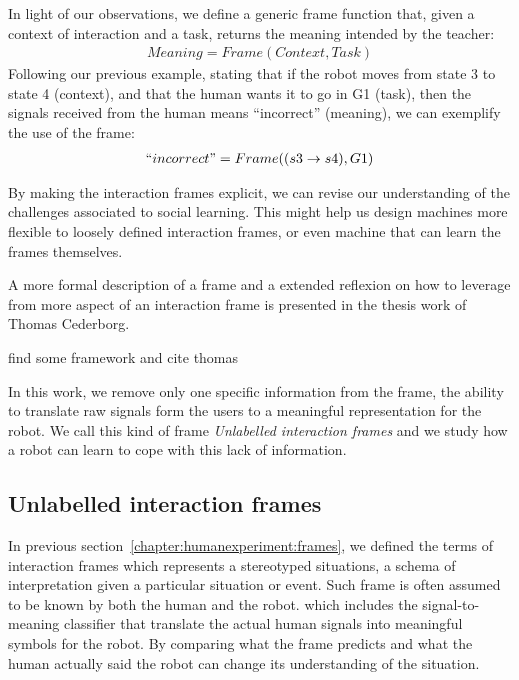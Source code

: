 
In light of our observations, we define a generic frame function that, given a context of interaction and a task, returns the meaning intended by the teacher:
%
\begin{eqnarray}
Meaning = Frame(Context, Task)
\end{eqnarray}
%
Following our previous example, stating that if the robot moves from state 3 to state 4 (context), and that the human wants it to go in G1 (task), then the signals received from the human means ``incorrect'' (meaning), we can exemplify the use of the frame:
%
\begin{eqnarray}
``incorrect" = Frame((s3 \rightarrow s4), G1)
\end{eqnarray}





By making the interaction frames explicit, we can revise our understanding of the challenges associated to social learning. This might help us design machines more flexible to loosely defined interaction frames, or even machine that can learn the frames themselves.

A more formal description of a frame and a extended reflexion on how to leverage from more aspect of an interaction frame is presented in the thesis work of Thomas Cederborg. 


find some framework and cite thomas \cite{cederborg2013language}



In this work, we remove only one specific information from the frame, the ability to translate raw signals form the users to a meaningful representation for the robot. We call this kind of frame \emph{Unlabelled interaction frames} and we study how a robot can learn to cope with this lack of information. 

\subsection{Unlabelled interaction frames}

In previous section~\ref{chapter:humanexperiment:frames}, we defined the terms of interaction frames which represents a stereotyped situations, a schema of interpretation given a particular situation or event. Such frame is often assumed to be known by both the human and the robot.  which includes the signal-to-meaning classifier that translate the actual human signals into meaningful symbols for the robot. By comparing what the frame predicts and what the human actually said the robot can change its understanding of the situation.

